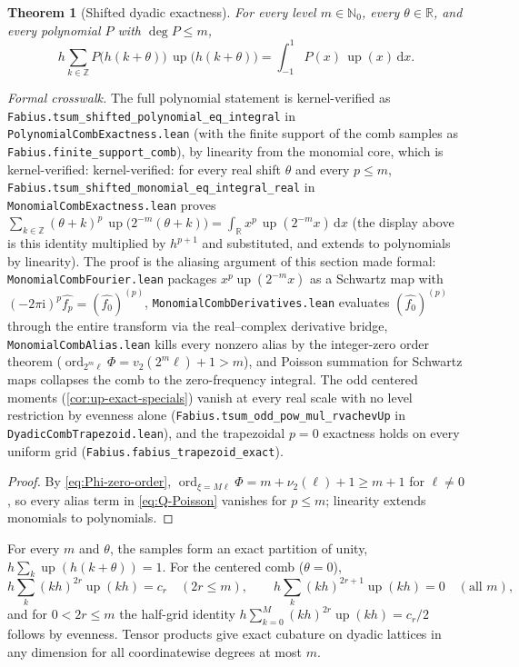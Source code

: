 \documentclass[11pt,oneside]{article}
\numberwithin{equation}{section}
\newtheorem{theorem}{Theorem}[section]
\theoremstyle{definition}
\theoremstyle{remark}
\newcommand{\R}{\mathbb R}
\newcommand{\N}{\mathbb N}
\newcommand{\Z}{\mathbb Z}
\newcommand{\dd}{\,\mathrm d}
\newcommand{\ii}{\mathrm i}
\newcommand{\Up}{\operatorname{up}}
\newcommand{\vtwo}{\nu_2}
\DeclareMathOperator{\ord}{ord}
\begin{document}
\begin{theorem}[Shifted dyadic exactness]
\label{thm:shifted-exactness}
For every level $m\in\N_0$, every $\theta\in\R$, and every polynomial
$P$ with $\deg P\le m$,
\begin{equation}
 \boxed{\;
 h\sum_{k\in\Z}P\bigl(h(k+\theta)\bigr)\,
 \Up\bigl(h(k+\theta)\bigr)
 =\int_{-1}^{1}P(x)\,\Up(x)\dd x.
 \;}
 \label{eq:polynomial-exactness}
\end{equation}
\end{theorem}

\emph{Formal crosswalk.}  The full polynomial statement is kernel-verified as
\nolinkurl{Fabius.tsum_shifted_polynomial_eq_integral} in
\nolinkurl{PolynomialCombExactness.lean} (with the finite support of the comb samples
as \nolinkurl{Fabius.finite_support_comb}), by linearity from the monomial core, which is
kernel-verified: kernel-verified: for
every real shift $\theta$ and every $p\le m$,
\nolinkurl{Fabius.tsum_shifted_monomial_eq_integral_real} in
\nolinkurl{MonomialCombExactness.lean} proves
$\sum_{k\in\Z}(\theta+k)^{p}\,\Up\bigl(2^{-m}(\theta+k)\bigr)=\int_\R x^{p}\,\Up(2^{-m}x)\dd x$
(the display above is this identity multiplied by $h^{p+1}$ and substituted, and
extends to polynomials by linearity).  The proof is the aliasing argument of this
section made formal: \nolinkurl{MonomialCombFourier.lean} packages $x^{p}\Up(2^{-m}x)$ as a
Schwartz map with $(-2\pi\ii)^{p}\widehat{f_p}=(\widehat{f_0})^{(p)}$,
\nolinkurl{MonomialCombDerivatives.lean} evaluates $(\widehat{f_0})^{(p)}$ through the entire
transform via the real--complex derivative bridge, \nolinkurl{MonomialCombAlias.lean} kills
every nonzero alias by the integer-zero order theorem ($\ord_{2^{m}\ell}\Phi=v_2(2^{m}\ell)+1>m$),
and Poisson summation for Schwartz maps collapses the comb to the zero-frequency
integral.  The odd centered moments (\cref{cor:up-exact-specials}) vanish at every real
scale with no level restriction by evenness alone
(\nolinkurl{Fabius.tsum_odd_pow_mul_rvachevUp} in \nolinkurl{DyadicCombTrapezoid.lean}), and the
trapezoidal $p=0$ exactness holds on every uniform grid
(\nolinkurl{Fabius.fabius_trapezoid_exact}).

\begin{proof}
By \eqref{eq:Phi-zero-order},
$\ord_{\xi=M\ell}\Phi=m+\vtwo(\ell)+1\ge m+1$ for $\ell\ne0$, so every
alias term in \eqref{eq:Q-Poisson} vanishes for $p\le m$; linearity
extends monomials to polynomials.
\end{proof}

\begin{corollary}
\label{cor:up-exact-specials}
For every $m$ and $\theta$, the samples form an exact partition of
unity, $h\sum_k\Up(h(k+\theta))=1$.  For the centered comb
($\theta=0$),
\begin{equation}
 h\sum_{k}(kh)^{2r}\Up(kh)=c_r\quad(2r\le m),
 \qquad
 h\sum_{k}(kh)^{2r+1}\Up(kh)=0\quad(\text{all }m),
 \label{eq:centered-moments}
\end{equation}
and for $0<2r\le m$ the half-grid identity
$h\sum_{k=0}^{M}(kh)^{2r}\Up(kh)=c_r/2$ follows by evenness.
Tensor products give exact cubature on dyadic lattices in any
dimension for all coordinatewise degrees at most $m$.
\end{corollary}
\end{document}
